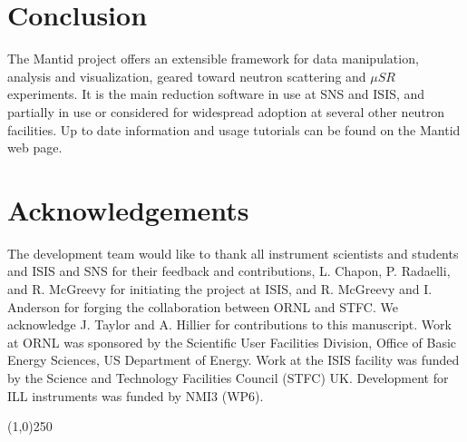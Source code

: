 \documentclass[1p]{elsarticle}
\begin{document}
\section{Conclusion}
The Mantid project offers an extensible framework for data manipulation, analysis and visualization, geared toward neutron scattering and $\mu SR$ experiments. It is the main reduction software in use at SNS and ISIS, and partially in use or considered for widespread adoption at several other neutron facilities. Up to date information and usage tutorials can be found on the Mantid web page\cite{webpage}. 

\section{Acknowledgements}
The development team would like to thank all instrument scientists and students and ISIS and SNS for their feedback and contributions, L. Chapon, P. Radaelli, and R. McGreevy for initiating the project at ISIS, and R. McGreevy and I. Anderson for forging the collaboration between ORNL and STFC. We acknowledge J. Taylor and A. Hillier for contributions to this manuscript. Work at ORNL was sponsored by the Scientific User Facilities Division, Office of Basic Energy Sciences, US Department of Energy. Work at the ISIS facility was funded by the Science and Technology Facilities Council (STFC) UK. Development for ILL instruments was funded by NMI3 (WP6).

\begin{center}
\line(1,0){250}
\end{center}


{}

\end{document}
